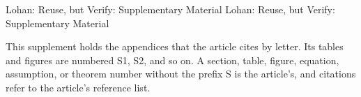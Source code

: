\documentclass{ieeeaccess}
\let\ieeeaccessclassyear\year
\def\year{2026}
\let\year\ieeeaccessclassyear
\theoremstyle{definition}
\begin{document}
\markboth
{Lohan: Reuse, but Verify: Supplementary Material}
{Lohan: Reuse, but Verify: Supplementary Material}

This supplement holds the appendices that the article cites by letter.
Its tables and figures are numbered S1, S2, and so on. A section,
table, figure, equation, assumption, or theorem number without the
prefix S is the article's, and citations refer to the article's
reference list.



\EOD
\end{document}

